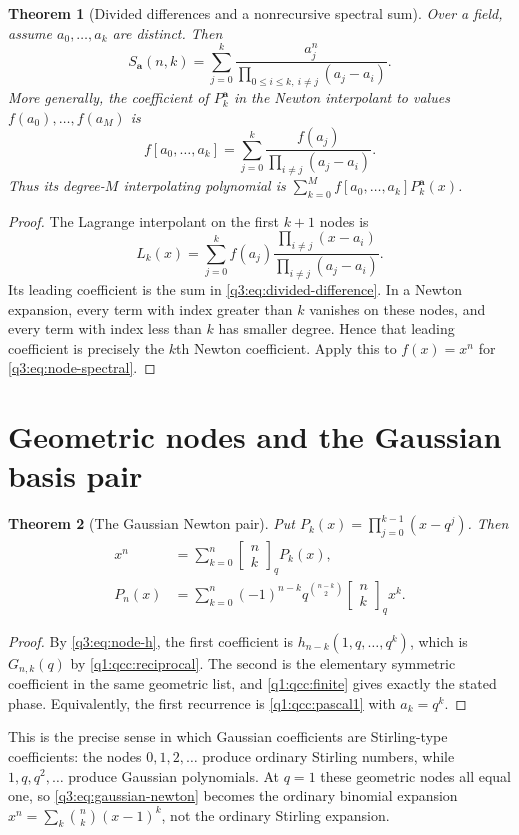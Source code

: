 \documentclass[11pt,a4paper,oneside,openany]{book}
\newtheorem{theorem}{Theorem}[chapter]
\theoremstyle{definition}
\theoremstyle{remark}
\newcommand{\GB}[3][q]{\begin{bmatrix}#2\\#3\end{bmatrix}_{#1}}
\newcommand{\G}[2]{\GB{#1}{#2}}
\begin{document}
\begin{theorem}[Divided differences and a nonrecursive spectral sum]
\label{q3:thm:divdiff}
Over a field, assume $a_0,\ldots,a_k$ are distinct. Then
\begin{equation}
 S_{\boldsymbol a}(n,k)
 =\sum_{j=0}^k\frac{a_j^n}{\prod_{0\le i\le k,\ i\ne j}(a_j-a_i)}.
 \label{q3:eq:node-spectral}
\end{equation}
More generally, the coefficient of $P_k^{\boldsymbol a}$ in the Newton
interpolant to values $f(a_0),\ldots,f(a_M)$ is
\begin{equation}
 f[a_0,\ldots,a_k]
 =\sum_{j=0}^k\frac{f(a_j)}{\prod_{i\ne j}(a_j-a_i)}.
 \label{q3:eq:divided-difference}
\end{equation}
Thus its degree-$M$ interpolating polynomial is
$\sum_{k=0}^Mf[a_0,\ldots,a_k]P_k^{\boldsymbol a}(x)$.
\end{theorem}
\begin{proof}
The Lagrange interpolant on the first $k+1$ nodes is
\[
 L_k(x)=\sum_{j=0}^kf(a_j)
 \frac{\prod_{i\ne j}(x-a_i)}{\prod_{i\ne j}(a_j-a_i)}.
\]
Its leading coefficient is the sum in \cref{q3:eq:divided-difference}.
In a Newton expansion, every term with index greater than $k$ vanishes
on these nodes, and every term with index less than $k$ has smaller
degree. Hence that leading coefficient is precisely the $k$th Newton
coefficient. Apply this to $f(x)=x^n$ for \cref{q3:eq:node-spectral}.
\end{proof}

\section{Geometric nodes and the Gaussian basis pair}
\begin{theorem}[The Gaussian Newton pair]
\label{q3:thm:gaussian-newton}
Put $P_k(x)=\prod_{j=0}^{k-1}(x-q^j)$. Then
\begin{align}
 x^n&=\sum_{k=0}^n\G nk P_k(x),
 \label{q3:eq:gaussian-newton}\\
 P_n(x)&=\sum_{k=0}^n(-1)^{n-k}q^{\binom{n-k}2}\G nk x^k.
 \label{q3:eq:gaussian-newton-inverse}
\end{align}
\end{theorem}
\begin{proof}
By \cref{q3:eq:node-h}, the first coefficient is
$h_{n-k}(1,q,\ldots,q^k)$, which is $G_{n,k}(q)$ by
\cref{q1:qcc:reciprocal}. The second is the elementary symmetric
coefficient in the same geometric list, and \cref{q1:qcc:finite} gives
exactly the stated phase. Equivalently, the first recurrence is
\cref{q1:qcc:pascal1} with $a_k=q^k$.
\end{proof}
This is the precise sense in which Gaussian coefficients are
Stirling-type coefficients: the nodes $0,1,2,\ldots$ produce ordinary
Stirling numbers, while $1,q,q^2,\ldots$ produce Gaussian polynomials.
At $q=1$ these geometric nodes all equal one, so
\cref{q3:eq:gaussian-newton} becomes the ordinary binomial expansion
$x^n=\sum_k\binom nk(x-1)^k$, not the ordinary Stirling expansion.
\end{document}
